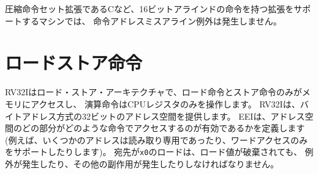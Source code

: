 \begin{commentary}
\begin{comment}
Instruction-address-misaligned exceptions are not possible on machines
that support extensions with 16-bit aligned instructions, such as the
compressed instruction-set extension, C.
\end{comment}

圧縮命令セット拡張であるCなど、16ビットアラインドの命令を持つ拡張をサポートするマシンでは、
命令アドレスミスアライン例外は発生しません。
\end{commentary}

\begin{comment}
\section{Load and Store Instructions}
\end{comment}
\section{ロードストア命令}
\label{sec:rv32:ldst}

\begin{comment}
RV32I is a load-store architecture, where only load and store
instructions access memory and arithmetic instructions only operate on
CPU registers.  RV32I provides a 32-bit address space that is
byte-addressed.
The EEI will define what portions of the address space are legal to access with
which instructions (e.g., some addresses might be read only, or
support word access only).  Loads with a destination of {\tt x0} must
still raise any exceptions and cause any other side effects even
though the load value is discarded.
\end{comment}

RV32Iはロード・ストア・アーキテクチャで、ロード命令とストア命令のみがメモリにアクセスし、
演算命令はCPUレジスタのみを操作します。 
RV32Iは、バイトアドレス方式の32ビットのアドレス空間を提供します。
EEIは、アドレス空間のどの部分がどのような命令でアクセスするのが有効であるかを定義します
(例えば、いくつかのアドレスは読み取り専用であったり、ワードアクセスのみをサポートしたりします)。
宛先が{\tt x0}のロードは、ロード値が破棄されても、
例外が発生したり、その他の副作用が発生したりしなければなりません。

\begin{comment}
The EEI will define whether the memory system is little-endian or big-endian.
In RISC-V, endianness is byte-address invariant.
\end{comment}

